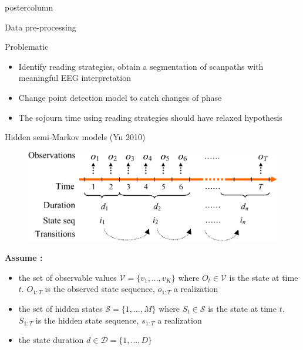 \documentclass[final,hyperref={pdfpagelabels=false}]{beamer}
\begin{document}
\begin{frame}
\begin{columns}
\begin{column}{.50\textwidth}
\begin{beamercolorbox}[center,wd=\textwidth]{postercolumn}
\begin{minipage}[T]{.98\textwidth}
{\begin{block}{Data pre-processing}
            \end{block}
            \vfill
            \begin{block}{Problematic}
                \begin{itemize}
                    \item[\bullet] Identify reading strategies, obtain a segmentation of scanpaths with meaningful EEG interpretation
                    \item[\bullet] Change point detection model to catch changes of phase
                    \item[\bullet] The sojourn time using reading strategies should have relaxed hypothesis
                \end{itemize}
            \end{block}
            \vfill
            \begin{block}{Hidden semi-Markov models (Yu 2010)}
                \begin{figure}[H]
                    \includegraphics[width=.48\linewidth]{hsmm_representation.png}
                \end{figure}
                \textbf{Assume :}
                \vskip0.3cm
                \begin{itemize}
                    \item[\bullet] the set of observable values $\mathcal{V} = \{ v_1,..., v_K\}$
                    where $O_t \in \mathcal{V}$ is the state at time $t$. $O_{1:T}$ is the observed state sequence,
                    $o_{1:T}$ a realization
                    \item[\bullet] the set of hidden states $\mathcal{S}=\{1,...,M\}$
                    where $S_t \in \mathcal{S}$ is the state at time $t$. $S_{1:T}$ is the hidden state sequence,
                    $s_{1:T}$ a realization
                    \item[\bullet] the state duration $d \in \mathcal{D}=\{1,...,D\}$
                \end{itemize}


\end{block}}
\end{minipage}
\end{beamercolorbox}
\end{column}
\end{columns}
\end{frame}
\end{document}
